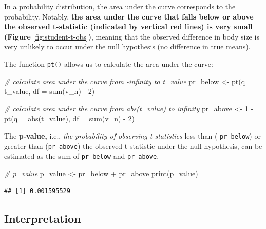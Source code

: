 \documentclass[
]{book}
\newenvironment{Shaded}{\begin{snugshade}}{\end{snugshade}}
\newcommand{\AttributeTok}[1]{\textcolor[rgb]{0.77,0.63,0.00}{#1}}
\newcommand{\CommentTok}[1]{\textcolor[rgb]{0.56,0.35,0.01}{\textit{#1}}}
\newcommand{\DecValTok}[1]{\textcolor[rgb]{0.00,0.00,0.81}{#1}}
\newcommand{\FunctionTok}[1]{\textcolor[rgb]{0.00,0.00,0.00}{#1}}
\newcommand{\NormalTok}[1]{#1}
\newcommand{\OtherTok}[1]{\textcolor[rgb]{0.56,0.35,0.01}{#1}}
\newcommand{\SpecialCharTok}[1]{\textcolor[rgb]{0.00,0.00,0.00}{#1}}
\begin{document}
In a probability distribution, the area under the curve corresponds to the probability. Notably, \textbf{the area under the curve that falls below or above the observed t-statistic (indicated by vertical red lines) is very small (Figure} \ref{fig:student-t-obs}\textbf{)}, meaning that the observed difference in body size is very unlikely to occur under the null hypothesis (no difference in true means).

The function \texttt{pt()} allows us to calculate the area under the curve:

\begin{Shaded}
\begin{Highlighting}[]
\CommentTok{\# calculate area under the curve from {-}infinity to t\_value}
\NormalTok{pr\_below }\OtherTok{\textless{}{-}} \FunctionTok{pt}\NormalTok{(}\AttributeTok{q =}\NormalTok{ t\_value, }\AttributeTok{df =} \FunctionTok{sum}\NormalTok{(v\_n) }\SpecialCharTok{{-}} \DecValTok{2}\NormalTok{)}

\CommentTok{\# calculate area under the curve from abs(t\_value) to infinity}
\NormalTok{pr\_above }\OtherTok{\textless{}{-}} \DecValTok{1} \SpecialCharTok{{-}} \FunctionTok{pt}\NormalTok{(}\AttributeTok{q =} \FunctionTok{abs}\NormalTok{(t\_value), }\AttributeTok{df =} \FunctionTok{sum}\NormalTok{(v\_n) }\SpecialCharTok{{-}} \DecValTok{2}\NormalTok{)}
\end{Highlighting}
\end{Shaded}

The \textbf{p-value,} i.e., \emph{the probability of observing t-statistics} less than ( \texttt{pr\_below}) or greater than (\texttt{pr\_above}) the observed t-statistic under the null hypothesis, can be estimated as the sum of \texttt{pr\_below} and \texttt{pr\_above}.

\begin{Shaded}
\begin{Highlighting}[]
\CommentTok{\# p\_value}
\NormalTok{p\_value }\OtherTok{\textless{}{-}}\NormalTok{ pr\_below }\SpecialCharTok{+}\NormalTok{ pr\_above}
\FunctionTok{print}\NormalTok{(p\_value)}
\end{Highlighting}
\end{Shaded}

\begin{verbatim}
## [1] 0.001595529
\end{verbatim}

\hypertarget{interpretation}{%
\subsection{Interpretation}\label{interpretation}}
\end{document}
